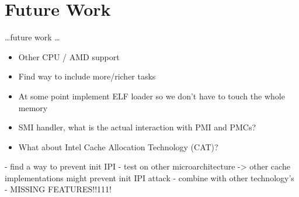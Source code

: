 \chapter{Future Work}
\label{sec:futurework}

\ldots future work \ldots

\begin{itemize}
    \item Other CPU / AMD support
    \item Find way to include more/richer tasks
    \item At some point implement ELF loader so we don't have to touch the whole memory
    \item SMI handler, what is the actual interaction with PMI and PMCs?
    \item What about Intel Cache Allocation Technology (CAT)?
\end{itemize}
- find a way to prevent init IPI
- test on other microarchitecture
-> other cache implementations might prevent init IPI attack
- combine with other technology's
- MISSING FEATURES!!111!
\cleardoublepage
